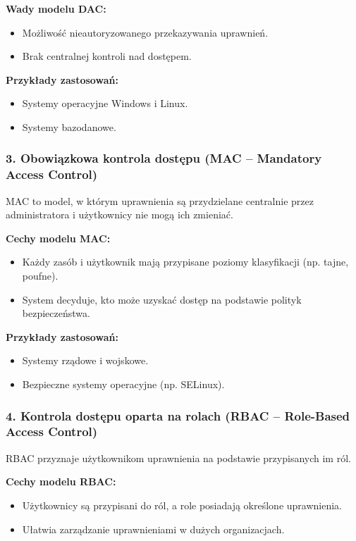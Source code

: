 \textbf{Wady modelu DAC:}
\begin{itemize}
    \item Możliwość nieautoryzowanego przekazywania uprawnień.
    \item Brak centralnej kontroli nad dostępem.
\end{itemize}

\textbf{Przykłady zastosowań:}
\begin{itemize}
    \item Systemy operacyjne Windows i Linux.
    \item Systemy bazodanowe.
\end{itemize}

\subsubsection{3. Obowiązkowa kontrola dostępu (MAC – Mandatory Access Control)}
MAC to model, w którym uprawnienia są przydzielane centralnie przez administratora i użytkownicy nie mogą ich zmieniać.

\textbf{Cechy modelu MAC:}
\begin{itemize}
    \item Każdy zasób i użytkownik mają przypisane poziomy klasyfikacji (np. tajne, poufne).
    \item System decyduje, kto może uzyskać dostęp na podstawie polityk bezpieczeństwa.
\end{itemize}

\textbf{Przykłady zastosowań:}
\begin{itemize}
    \item Systemy rządowe i wojskowe.
    \item Bezpieczne systemy operacyjne (np. SELinux).
\end{itemize}

\subsubsection{4. Kontrola dostępu oparta na rolach (RBAC – Role-Based Access Control)}
RBAC przyznaje użytkownikom uprawnienia na podstawie przypisanych im ról.

\textbf{Cechy modelu RBAC:}
\begin{itemize}
    \item Użytkownicy są przypisani do ról, a role posiadają określone uprawnienia.
    \item Ułatwia zarządzanie uprawnieniami w dużych organizacjach.
\end{itemize}

